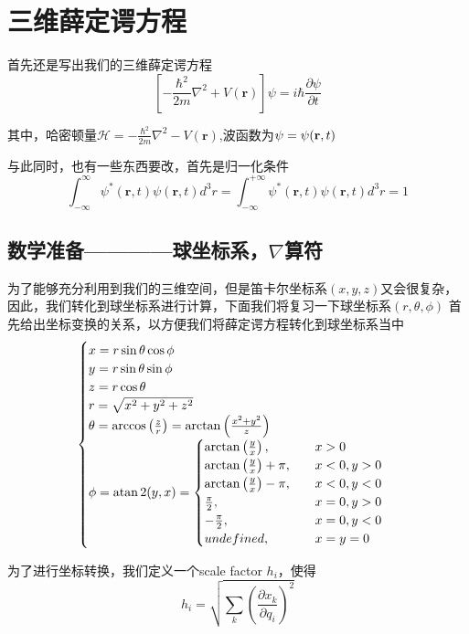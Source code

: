 \documentclass{article}
\begin{document}
\section{三维薛定谔方程}

首先还是写出我们的三维薛定谔方程
\[
    \left[-\frac{\hbar^2}{2m}\nabla^2+V(\textbf{r})\right]\psi=i\hbar\frac{\partial\psi}{\partial t}
\]

其中，哈密顿量$\displaystyle\mathcal{H}=-\frac{\hbar^2}{2m}\nabla^2-V(\textbf{r})$,波函数为$\psi=\psi(\textbf{r},t)\\$

与此同时，也有一些东西要改，首先是归一化条件
\[
    \int_{-\infty}^{\infty}\psi^*(\textbf{r},t)\psi(\textbf{r},t)d^3r=\int_{-\infty}^{+\infty}\psi^*(\textbf{r},t)\psi(\textbf{r},t)d^3r=1
\]
\subsection{数学准备————球坐标系，$\nabla$算符}
为了能够充分利用到我们的三维空间，但是笛卡尔坐标系$(x,y,z)$又会很复杂，因此，我们转化到球坐标系进行计算，下面我们将复习一下球坐标系$(r,\theta,\phi)$
首先给出坐标变换的关系，以方便我们将薛定谔方程转化到球坐标系当中
\[
    \begin{cases}
        x=r\sin\theta\cos\phi\\
        y=r\sin\theta\sin\phi\\
        z=r\cos\theta\\
        r=\sqrt{x^2+y^2+z^2}\\
        \theta=\arccos\left(\frac{z}{r}\right)=\arctan\left(\frac{x^2+y^2}{z}\right)\\
        \phi=\atan2(y,x)=
        \begin{cases}
            \arctan\left(\frac{y}{x}\right),&\quad x>0\\
            \arctan\left(\frac{y}{x}\right)+\pi,&\quad x<0,y>0\\
            \arctan\left(\frac{y}{x}\right)-\pi,&\quad x<0,y<0\\
            \frac{\pi}{2},&\quad x=0,y>0\\
            -\frac{\pi}{2},&\quad x=0,y<0\\
            undefined,&\quad x=y=0    
        \end{cases}
    \end{cases}
\]

为了进行坐标转换，我们定义一个scale factor $h_i$，使得
    \begin{equation*}
        h_i=\sqrt{\sum_{k}\left(\frac{\partial x_k}{\partial q_i}\right)^2}
    \end{equation*}
    
\end{document}
